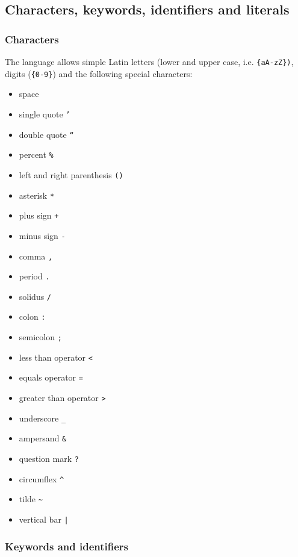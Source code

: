 \documentclass[11pt,a4paper]{ivoa}
\begin{document}
\clearpage
\subsection{Characters, keywords, identifiers and literals}
\subsubsection{Characters}
\label{sec:characters}

The language allows simple Latin letters (lower and upper case, i.e.
\verb:{aA-zZ}):, digits (\verb:{0-9}:) and the following special characters:

\begin{itemize}
    \item space
    \item single quote \verb:’:
    \item double quote \verb:“:
    \item percent \verb:%:
    \item left and right parenthesis \verb:():
    \item asterisk \verb:*:
    \item plus sign \verb:+:
    \item minus sign \verb:-:
    \item comma \verb:,:
    \item period \verb:.:
    \item solidus \verb:/:
    \item colon \verb.:.
    \item semicolon \verb:;:
    \item less than operator \verb:<:
    \item equals operator \verb:=:
    \item greater than operator \verb:>:
    \item underscore \verb:_:
    \item ampersand \verb:&:
    \item question mark \verb:?:
    \item circumflex \verb:^:
    \item tilde \verb:~:
    \item vertical bar \verb:|:
\end{itemize}

\subsubsection{Keywords and identifiers}
\label{sec:keywords}
\end{document}
